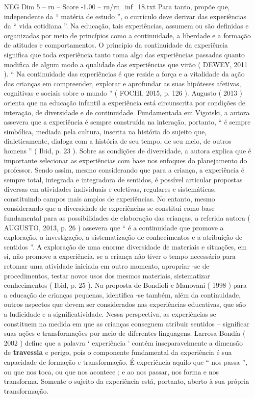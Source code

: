 \begin{textsample}{NEG Dim 5 – rn – Score -1.00 – rn/rn\_inf\_18.txt}
Para tanto, propõe que, independente da “ matéria de estudo ”, o currículo deve derivar das experiências da “ vida cotidiana ”.
Na educação, tais experiências, assumem ou são definidas e organizadas por meio de princípios como a continuidade, a liberdade e a formação de atitudes e comportamentos.
O princípio da continuidade da experiência significa que toda experiência tanto toma algo das experiências passadas quanto modifica de algum modo a qualidade das experiências que virão ( DEWEY, 2011 ). “ Na continuidade das experiências é que reside a força e a vitalidade da ação das crianças em compreender, explorar e aprofundar as suas hipóteses afetivas, cognitivas e sociais sobre o mundo ” ( FOCHI, 2015, p. 126 ).
Augusto ( 2013 ) orienta que na educação infantil a experiência está circunscrita por condições de interação, de diversidade e de continuidade.
Fundamentada em Vigotski, a autora assevera que a experiência é sempre construída na interação, portanto, “ é sempre simbólica, mediada pela cultura, inscrita na história do sujeito que, dialeticamente, dialoga com a história de seu tempo, de seu meio, de outros homens ” ( Ibid, p. 23 ).
Sobre as condições de diversidade, a autora explica que é importante selecionar as experiências com base nos enfoques do planejamento do professor.
Sendo assim, mesmo considerando que para a criança, a experiência é sempre total, integrada e integradora de sentidos, é possível articular propostas diversas em atividades individuais e coletivas, regulares e sistemáticas, constituindo campos mais amplos de experiências.
No entanto, mesmo considerando que a diversidade de experiências se constitui como base fundamental para as possibilidades de elaboração das crianças, a referida autora ( AUGUSTO, 2013, p. 26 ) assevera que “ é a continuidade que promove a exploração, a investigação, a sistematização de conhecimentos e a atribuição de sentidos ”.
A exploração de uma enorme diversidade de materiais e situações, em si, não promove a experiência, se a criança não tiver o tempo necessário para retomar uma atividade iniciada em outro momento, apropriar -se de procedimentos, testar novos usos dos mesmos materiais, sistematizar conhecimentos ( Ibid, p. 25 ).
Na proposta de Bondioli e Manovani ( 1998 ) para a educação de crianças pequenas, identifica -se também, além da continuidade, outros aspectos que devem ser considerados nas experiências educativas, que são a ludicidade e a significatividade.
Nessa perspectiva, as experiências se constituem na medida em que as crianças conseguem atribuir sentidos – significar suas ações e transformações por meio de diferentes linguagens.
Larrosa Bondía ( 2002 ) define que a palavra ‘ experiência ’ contém inseparavelmente a dimensão de \textbf{travessia} e perigo, pois o componente fundamental da experiência é sua capacidade de formação e transformação.
É experiência aquilo que “ nos passa ”, ou que nos toca, ou que nos acontece ; e ao nos passar, nos forma e nos transforma.
Somente o sujeito da experiência está, portanto, aberto à sua própria transformação.

\end{textsample}
